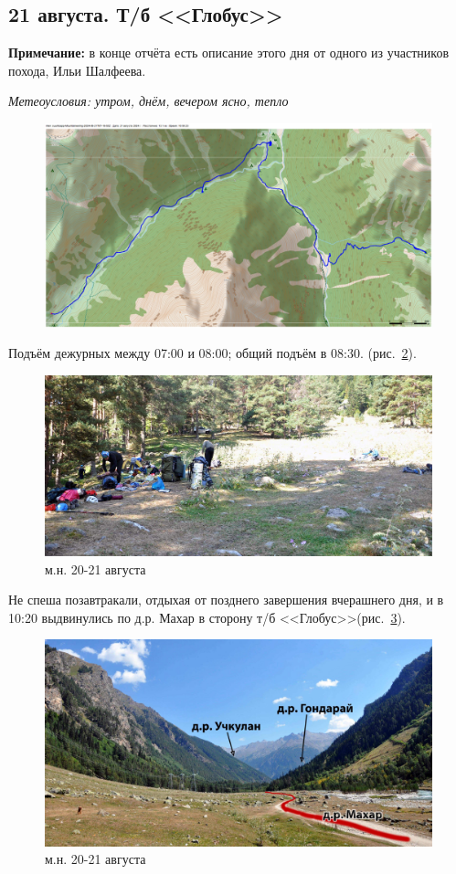 \subsection{21 августа. Т/б <<Глобус>>}
\textbf{Примечание:} в конце отчёта есть описание этого дня от одного из участников похода, Ильи Шалфеева.

\textit{Метеоусловия: утром, днём, вечером ясно, тепло}

\begin{figure}[h!]
	\centering
	\includegraphics[angle=0, width=0.7\linewidth]{../pics/mini_maps/21}
	\label{fig:mini_21}
\end{figure}

Подъём дежурных между 07:00 и 08:00; общий подъём в 08:30. (рис.~\ref{fig:DSC_0993}). 

\begin{figure}[h]
	\centering
	\includegraphics[width=0.7\linewidth]{../pics/DSC_0993}
	\caption{м.н. 20-21 августа}
	\label{fig:DSC_0993}
\end{figure}

Не спеша позавтракали, отдыхая от позднего завершения вчерашнего дня, и в 10:20 выдвинулись по д.р. Махар в сторону т/б <<Глобус>>(рис.~\ref{fig:DSC_1003}). 

\begin{figure}[h]
	\centering
	\includegraphics[width=0.7\linewidth]{../pics/DSC_1003}
	\caption{м.н. 20-21 августа}
	\label{fig:DSC_1003}
\end{figure}

